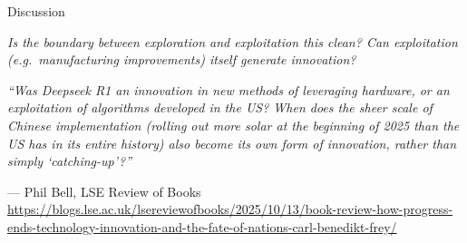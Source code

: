 \documentclass[aspectratio=169, 11pt]{beamer}
\begin{document}
\begin{frame}{Discussion}
    \begin{center}
        \large
        \textit{Is the boundary between exploration and exploitation this clean? Can exploitation (e.g.\ manufacturing improvements) itself generate innovation?}

        \vspace{1.5em}

        \small
        \textit{``Was Deepseek R1 an innovation in new methods of leveraging hardware, or an exploitation of algorithms developed in the US? When does the sheer scale of Chinese implementation (rolling out more solar at the beginning of 2025 than the US has in its entire history) also become its own form of innovation, rather than simply `catching-up'?''}

        \vspace{0.5em}
        \scriptsize --- Phil Bell, LSE Review of Books \\
        \tiny \url{https://blogs.lse.ac.uk/lsereviewofbooks/2025/10/13/book-review-how-progress-ends-technology-innovation-and-the-fate-of-nations-carl-benedikt-frey/}
    \end{center}
\end{frame}
\end{document}
